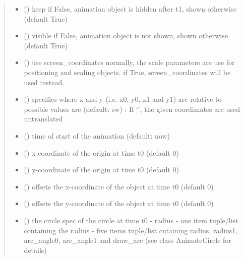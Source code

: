 \documentclass[letterpaper,10pt,english]{sphinxmanual}
\begin{document}
\begin{fulllineitems}
\begin{quote}
\begin{description}
\begin{itemize}
\item {} 
 () \textendash{} keep 
if False, animation object is hidden after t1, shown otherwise
(default True)

\item {} 
 () \textendash{} visible 
if False, animation object is not shown, shown otherwise
(default True)

\item {} 
 () \textendash{} use screen\_coordinates 
normally, the scale parameters are use for positioning and scaling
objects. 
if True, screen\_coordinates will be used instead.

\item {} 
 () \textendash{} specifies where x and y (i.e. x0, y0, x1 and y1) are relative to 
possible values are (default: sw) : 
If ‘’, the given coordimates are used untranslated

\item {} 
 () \textendash{} time of start of the animation (default: now)

\item {} 
 () \textendash{} x-coordinate of the origin at time t0 (default 0)

\item {} 
 () \textendash{} y-coordinate of the origin at time t0 (default 0)

\item {} 
 () \textendash{} offsets the x-coordinate of the object at time t0 (default 0)

\item {} 
 () \textendash{} offsets the y-coordinate of the object at time t0 (default 0)

\item {} 
 () \textendash{} the circle spec of the circle at time t0 
- radius 
- one item tuple/list containing the radius 
- five items tuple/list cntaining radius, radius1, arc\_angle0, arc\_angle1 and draw\_arc
(see class AnimateCircle for details)


\end{itemize}
\end{description}
\end{quote}
\end{fulllineitems}
\end{document}
